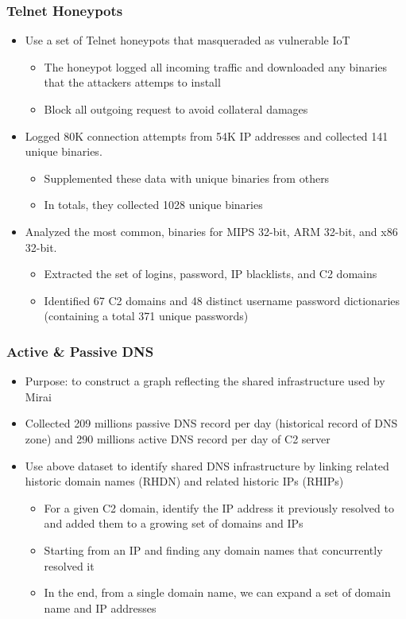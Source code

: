 \documentclass{beamer}
\begin{document}
\begin{frame}
	\frametitle{Telnet Honeypots}
	\begin{itemize}
		\item<+-> Use a set of Telnet honeypots that masqueraded as vulnerable IoT
		\begin{itemize}
			\item<+-> The honeypot logged all incoming traffic and downloaded any binaries that the attackers attemps to install
			\item<+-> Block all outgoing request to avoid collateral damages
		\end{itemize}
		\item<+-> Logged 80K connection attempts from 54K IP addresses and collected 141 unique binaries.
		\begin{itemize}
			\item<+-> Supplemented these data with unique binaries from others
			\item<+-> In totals, they collected 1028 unique binaries
		\end{itemize}
		\item<+-> Analyzed the most common, binaries for MIPS 32-bit, ARM 32-bit, and x86 32-bit.
		\begin{itemize}
			\item<+-> Extracted the set of logins, password, IP blacklists, and C2 domains
			\item<+-> Identified 67 C2 domains and 48 distinct username password dictionaries (containing a total 371 unique passwords)
		\end{itemize}
	\end{itemize}
\end{frame}

\begin{frame}
	\frametitle{Active \& Passive DNS}
	\begin{itemize}
		\item<+-> Purpose: to construct a graph reflecting the shared infrastructure used by Mirai
		\item<+-> Collected 209 millions passive DNS record per day (historical record of DNS zone) and 290 millions active DNS record per day of C2 server
		\item<+-> Use above dataset to identify shared DNS infrastructure by linking related historic domain names (RHDN) and related historic IPs (RHIPs)
		\begin{itemize}
			\item<+-> For a given C2 domain, identify the IP address it previously resolved to and added them to a growing set of domains and IPs
			\item<+-> Starting from an IP and finding any domain names that concurrently resolved it
			\item<+-> In the end, from a single domain name, we can expand a set of domain name and IP addresses
		\end{itemize}
	\end{itemize}
\end{frame}
\end{document}

